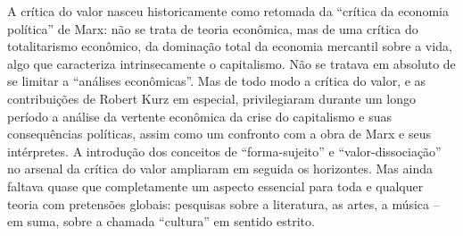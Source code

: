 A crítica do valor nasceu historicamente como retomada da ``crítica da
economia política'' de Marx: não se trata de teoria econômica, mas de
uma crítica do totalitarismo econômico, da dominação total da economia
mercantil sobre a vida, algo que caracteriza intrinsecamente o
capitalismo. Não se tratava em absoluto de se limitar a ``análises
econômicas''. Mas de todo modo a crítica do valor, e as contribuições de
Robert Kurz em especial, privilegiaram durante um longo período a
análise da vertente econômica da crise do capitalismo e suas
consequências políticas, assim como um confronto com a obra de Marx e
seus intérpretes. A introdução dos conceitos de ``forma-sujeito'' e
``valor-dissociação'' no arsenal da crítica do valor ampliaram em
seguida os horizontes. Mas ainda faltava quase que completamente um
aspecto essencial para toda e qualquer teoria com pretensões globais:
pesquisas sobre a literatura, as artes, a música -- em suma, sobre a
chamada ``cultura'' em sentido estrito.

